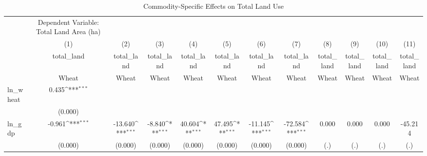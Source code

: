 \begin{table}[htbp]\centering
\def\sym#1{\ifmmode^{#1}\else\(^{#1}\)\fi}
\caption{Commodity-Specific Effects on Total Land Use\label{tab1}}
\begin{tabular}{l*{11}{c}}
\toprule
            &Dependent Variable: Total Land Area (ha)         &                     &                     &                     &                     &                     &                     &                     &                     &                     &                     \\
            &\multicolumn{1}{c}{(1)}&\multicolumn{1}{c}{(2)}&\multicolumn{1}{c}{(3)}&\multicolumn{1}{c}{(4)}&\multicolumn{1}{c}{(5)}&\multicolumn{1}{c}{(6)}&\multicolumn{1}{c}{(7)}&\multicolumn{1}{c}{(8)}&\multicolumn{1}{c}{(9)}&\multicolumn{1}{c}{(10)}&\multicolumn{1}{c}{(11)}\\
            &\multicolumn{1}{c}{total\_land}&\multicolumn{1}{c}{total\_land}&\multicolumn{1}{c}{total\_land}&\multicolumn{1}{c}{total\_land}&\multicolumn{1}{c}{total\_land}&\multicolumn{1}{c}{total\_land}&\multicolumn{1}{c}{total\_land}&\multicolumn{1}{c}{total\_land}&\multicolumn{1}{c}{total\_land}&\multicolumn{1}{c}{total\_land}&\multicolumn{1}{c}{total\_land}\\
            &       Wheat         &       Wheat         &       Wheat         &       Wheat         &       Wheat         &       Wheat         &       Wheat         &       Wheat         &       Wheat         &       Wheat         &       Wheat         \\
\midrule
ln\_wheat    &       0.435\sym{***}&                     &                     &                     &                     &                     &                     &                     &                     &                     &                     \\
            &     (0.000)         &                     &                     &                     &                     &                     &                     &                     &                     &                     &                     \\
\addlinespace
ln\_gdp      &      -0.961\sym{***}&     -13.640\sym{***}&      -8.840\sym{***}&      40.604\sym{***}&      47.495\sym{***}&     -11.145\sym{***}&     -72.584\sym{***}&       0.000         &       0.000         &       0.000         &     -45.214         \\
            &     (0.000)         &     (0.000)         &     (0.000)         &     (0.000)         &     (0.000)         &     (0.000)         &     (0.000)         &         (.)         &         (.)         &         (.)         &         (.)         \\

\end{tabular}
\end{table}
